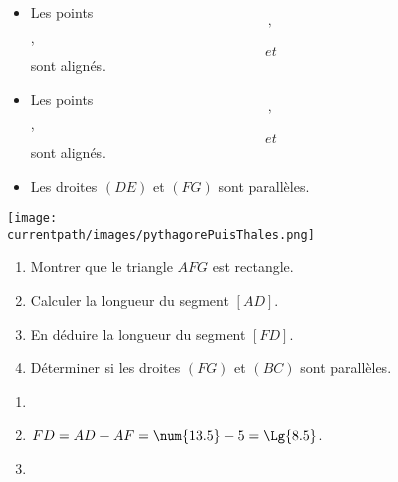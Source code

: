 \begin{exercice*}
    \begin{itemize}
        \item Les points $$, $$, $$ et $$ sont alignés.
        \item Les points $$, $$, $$ et $$ sont alignés.
        \item Les droites $(DE)$ et $(FG)$ sont parallèles.
    \end{itemize}

    \begin{minipage}{1\linewidth}
    \begin{center}
        \texttt{[image: \\currentpath/images/pythagorePuisThales.png]}    
    \end{center}
    \end{minipage}    

    \begin{enumerate}
        \item Montrer que le triangle $AFG$ est rectangle.
        \item Calculer la longueur du segment $[AD]$.
        \item En déduire la longueur du segment $[FD]$.
        \item Déterminer si les droites $(FG)$ et $(BC)$ sont parallèles.        
    \end{enumerate}
\end{exercice*}
\begin{corrige}

    \begin{enumerate}
        \item {}
        \item {}
        
        $FD=AD-AF=\num{13.5}-5=\Lg{8.5}$.
        \item {}
    \end{enumerate}
\end{corrige}



